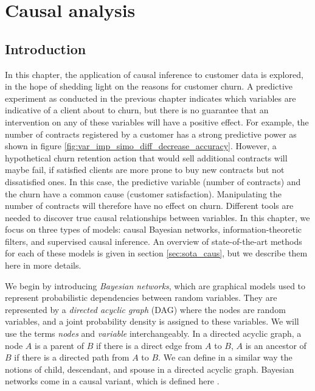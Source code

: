 \chapter{Causal analysis}
\label{ch:caus}

\section{Introduction}
\label{sec:causal_intro}

In this chapter, the application of causal inference to customer data is
explored, in the hope of shedding light on the reasons for customer churn. A
predictive experiment as conducted in the previous chapter indicates which
variables are indicative of a client about to churn, but there is no guarantee
that an intervention on any of these variables will have a positive effect. For
example, the number of contracts registered by a customer has a strong
predictive power as shown in figure
\ref{fig:var_imp_simo_diff_decrease_accuracy}. However, a hypothetical churn
retention action that would sell additional contracts will maybe fail, if
satisfied clients are more prone to buy new contracts but not dissatisfied ones.
In this case, the predictive variable  (number of contracts) and the churn have
a common cause (customer satisfaction). Manipulating the number of contracts
will therefore have no effect on churn. Different tools are needed to discover
true causal relationships between variables. In this chapter, we focus on three
types of models: causal Bayesian networks, information-theoretic filters, and
supervised causal inference. An overview of state-of-the-art methods for each of
these models is given in section \ref{sec:sota_caus}, but we describe them here
in more details.

We begin by introducing \emph{Bayesian networks}, which are graphical models
used to represent probabilistic dependencies between random variables. They are
represented by a \emph{directed acyclic graph} (DAG) where the nodes are random
variables, and a joint probability density is assigned to these variables. We
will use the terms \emph{nodes} and \emph{variable} interchangeably. In a
directed acyclic graph, a node $A$ is a parent of $B$ if there is a direct edge
from $A$ to $B$, $A$ is an ancestor of $B$ if there is a directed path from $A$
to $B$. We can define in a similar way the notions of child, descendant, and
spouse in a directed acyclic graph. Bayesian networks come in a causal variant,
which is defined here \parencite{guyon2007causal}.

